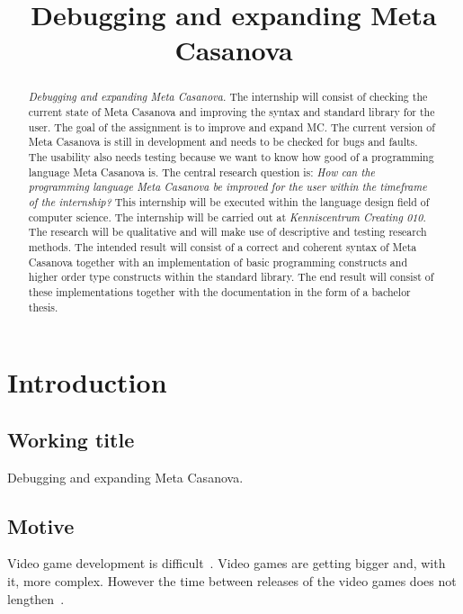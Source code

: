 



\title{Debugging and expanding Meta Casanova}
\author{\writer}

\begin{titlepage}
   
\end{titlepage}

\begin{abstract}
   \emph{Debugging and expanding Meta Casanova.}
   The internship will consist of checking the current state of Meta Casanova and improving the syntax and standard library for the user.
   The goal of the assignment is to improve and expand MC.
   The current version of Meta Casanova is still in development and needs to be checked for bugs and faults.
   The usability also needs testing because we want to know how good of a programming language Meta Casanova is.
   The central research question is: \emph{How can the programming language Meta Casanova be improved for the user within the timeframe of the internship?}
   This internship will be executed within the language design field of computer science.
   The internship will be carried out at \emph{Kenniscentrum Creating 010}.
   The research will be qualitative and will make use of descriptive and testing research methods.
   The intended result will consist of a correct and coherent syntax of Meta Casanova together with an implementation of basic programming constructs and higher order type constructs within the standard library.
   The end result will consist of these implementations together with the documentation in the form of a bachelor thesis.
\end{abstract}

\section{Introduction}
\subsection{Working title}
Debugging and expanding Meta Casanova.

\subsection{Motive}
Video game development is difficult~\cite{blow2004game}.
Video games are getting bigger and, with it, more complex.
However the time between releases of the video games does not lengthen~\cite{blow2004game}.

